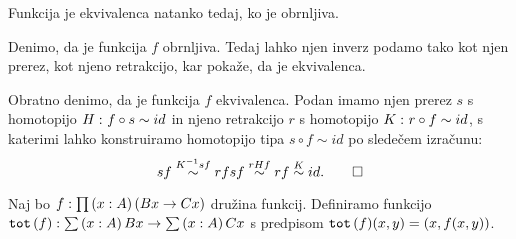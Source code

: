 \begin{trditev}
  \label{inv-of-equiv}
  Funkcija je ekvivalenca natanko tedaj, ko je obrnljiva.
\end{trditev}

\begin{dokaz}
  Denimo, da je funkcija \(f\) obrnljiva. Tedaj lahko njen inverz podamo tako kot njen
  prerez, kot njeno retrakcijo, kar pokaže, da je ekvivalenca.

  Obratno denimo, da je funkcija \(f\) ekvivalenca. Podan imamo njen prerez \(s\) s
  homotopijo \(H \,\colon f \circ s \sim id\) in njeno retrakcijo \(r\) s homotopijo
  \(K \,\colon r \circ f \sim id\), s katerimi lahko konstruiramo homotopijo tipa
  \(s \circ f \sim id\) po sledečem izračunu:
  \[s f \overset{K^{-1}sf}{\sim} r f s f \overset{rHf}{\sim} r f \overset{K}{\sim} id. \qedhere\]
\end{dokaz}

\begin{comment}
\begin{definicija}
  Naj bo \(\defun{f}{A}{B}\) funkcija in \(\typejudgment{b}{B}\). Tip
  \[\fib{f}{b} := \sumtype{x}{A}{f(x) = b}\]
  imenujemo \emph{vlakno funkcije f pri točki b}.
\end{definicija}

\begin{trditev}
  Funkcija \(f\) je obrnljiva natanko tedaj, ko je vlakno funkcije \(f\) pri \(y\)
  kontraktibilno za vsak \(\typejudgment{y}{B}\).
\end{trditev}

\begin{dokaz}
  Denimo najprej, da je funkcija \(\defun{f}{A}{B}\) obrnljiva in naj bo
  \(\typejudgment{y}{B}\). Dokazati želimo, da je tip
  \(\fib{f}{y} = \sumtype{x}{A}{fx = y}\)
  kontraktibilen. Ker je funkcija \(f\) obrnljiva, obstaja funkcija \(\defun{g}{B}{A}\)
  in homotopija \(\homotopy{H}{f \circ g}{id}\), zato lahko za center kontrakcije
  tipa \(\fib{f}{y}\) izberemo element \(\left(g(y), H(y)\right)\). Da bi konstruirali
\end{dokaz}
\end{comment}

\begin{definicija}
  Naj bo \(f : \prod \left( x : A \right) \left(Bx \to Cx\right)\) družina funkcij.
  Definiramo funkcijo
  \(\textnormal{\texttt{tot}}\,(f) : \sum \left( x : A \right) Bx \to \sum \left( x : A \right) Cx\) s predpisom
  \(\textnormal{\texttt{tot}}\,(f)(x, y) = (x, f(x, y))\).
\end{definicija}

